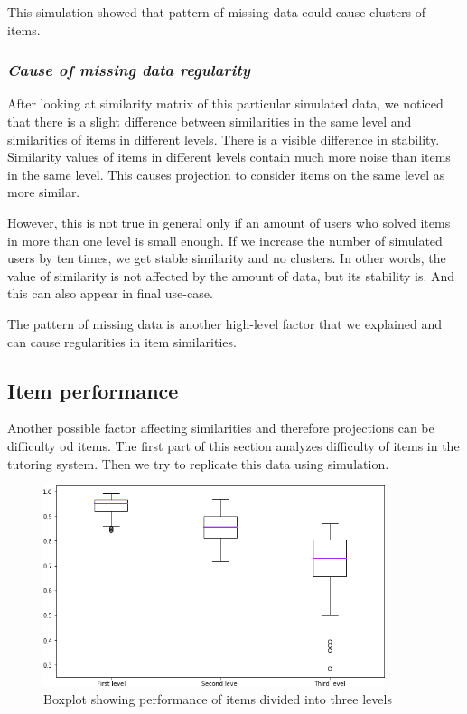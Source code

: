 \documentclass[
  print, %
  table,   %
  nolof,     %
  nolot,     %
  nocover,
  color,
  final,
]{fithesis3}
\begin{document}
This simulation showed that pattern of missing data could cause clusters of items.


\subsubsection{\textit{Cause of missing data regularity}}\label{cause-of-missing-data-regularity}

After looking at similarity matrix of this particular simulated data, we noticed that there is a slight difference between similarities in the same level and similarities of items in different levels. There is a visible difference in stability. Similarity values of items in different levels contain much more noise than items in the same level. This causes projection to consider items on the same level as more similar.

However, this is not true in general only if an amount of users who solved items in more than one level is small enough. If we increase the number of simulated users by ten times, we get stable similarity and no clusters. In other words, the value of similarity is not affected by the amount of data, but its stability is. And this can also appear in final use-case.

The pattern of missing data is another high-level factor that we explained and can cause regularities in item similarities.


\subsection{Item performance}\label{item-performance}

Another possible factor affecting similarities and therefore projections can be difficulty od items. The first part of this section analyzes difficulty of items in the tutoring system. Then we try to replicate this data using simulation.

\begin{figure}
  \includegraphics[width=10cm]{img/items_performance_levels}
  \caption{Boxplot showing performance of items divided into three levels}
  \label{fig:item_performance_levels}
\end{figure}
\end{document}
